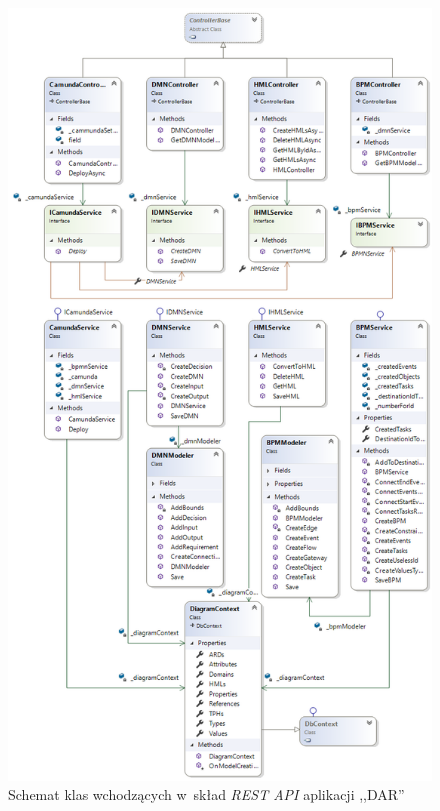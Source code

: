 \begin{figure}
    \centering
    \includegraphics[width=\textwidth, height=0.95\textheight,keepaspectratio]{./assets/classDiagram.png}
    \caption{Schemat klas wchodzących w~skład \emph{REST API} aplikacji ,,DAR''}
    \label{fig:classDiagram1}
\end{figure}


